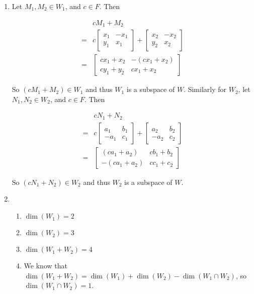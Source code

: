 \documentclass[12pt]{article}
\begin{document}
  {
    \begin{enumerate}
      \item Let $M_1, M_2 \in W_1$, and $c \in F$. Then

        \begin{align*}
           &cM_1 + M_2 \\
          =&c\begin{bmatrix}
            x_1 & -x_1 \\
            y_1 & x_1
          \end{bmatrix}
          +
          \begin{bmatrix}
            x_2 & -x_2 \\
            y_2 & x_2
          \end{bmatrix} \\
          =&\begin{bmatrix}
            cx_1 + x_2 & -(cx_1 + x_2) \\
            cy_1 + y_2 & cx_1 + x_2
          \end{bmatrix}
        \end{align*}

        So $(cM_1 + M_2) \in W_1$ and thus $W_1$ is a subspace of $W$. Similarly
        for $W_2$, let $N_1, N_2 \in W_2$, and $c \in F$. Then

        \begin{align*}
           &cN_1 + N_2 \\
          =&c\begin{bmatrix}
            a_1 & b_1 \\
           -a_1 & c_1
          \end{bmatrix}
          +
          \begin{bmatrix}
            a_2 & b_2 \\
           -a_2 & c_2
          \end{bmatrix} \\
        =&\begin{bmatrix}
           (ca_1 + a_2) & cb_1 + b_2 \\
          -(ca_1 + a_2) & cc_1 + c_2
          \end{bmatrix}
        \end{align*}

        So $(cN_1 + N_2) \in W_2$ and thus $W_2$ is a subspace of $W$.

      \item 
        \begin{enumerate}
          \item $\dim(W_1) = 2$
          \item $\dim(W_2) = 3$
          \item $\dim(W_1 + W_2) = 4$
          \item We know that $\dim(W_1 + W_2) = \dim(W_1) + \dim(W_2) - \dim(W_1
            \cap W_2)$, so $\dim(W_1 \cap W_2) = 1$.
        \end{enumerate}
    \end{enumerate}
  }
\end{document}
